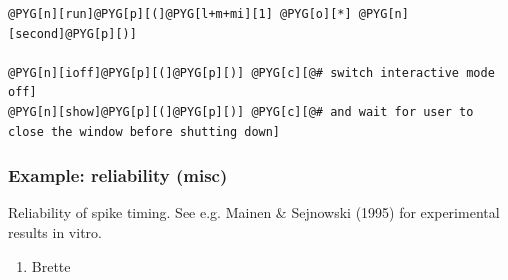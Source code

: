 \documentclass[letterpaper,10pt,english]{manual}
\begin{document}
\begin{Verbatim}[commandchars=@\[\]]
@PYG[n][run]@PYG[p][(]@PYG[l+m+mi][1] @PYG[o][*] @PYG[n][second]@PYG[p][)]

@PYG[n][ioff]@PYG[p][(]@PYG[p][)] @PYG[c][@# switch interactive mode off]
@PYG[n][show]@PYG[p][(]@PYG[p][)] @PYG[c][@# and wait for user to close the window before shutting down]
\end{Verbatim}

\resetcurrentobjects
\hypertarget{--doc-examples-misc_reliability}{}

\hypertarget{index-64}{}\subsubsection{Example: reliability (misc)}

Reliability of spike timing.
See e.g. Mainen \& Sejnowski (1995) for experimental results in vitro.
\begin{enumerate}
\item {} 
Brette

\end{enumerate}
\end{document}
